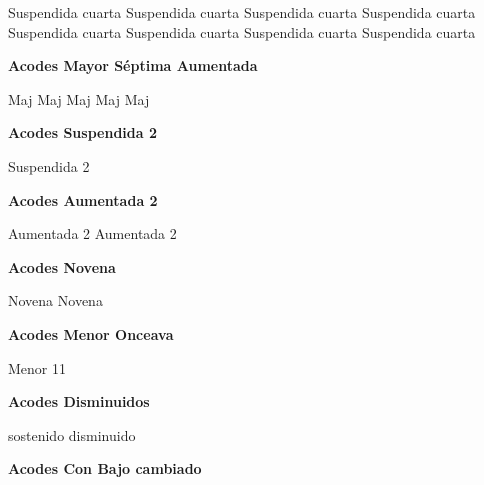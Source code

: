 \small
{} Suspendida cuarta  \qquad\qquad
{} Suspendida cuarta \qquad\qquad
{} Suspendida cuarta
\vskip 25pt
 Suspendida cuarta \qquad\qquad
{} Suspendida cuarta \qquad\qquad
{} Suspendida cuarta
\vskip 25pt
 Suspendida cuarta \qquad\qquad
{} Suspendida cuarta
\normalsize

\vskip 20pt
\textbf{Acodes Mayor S\'eptima Aumentada}
\vskip 25pt

\small
{} Maj \hfill
{} Maj \hfill
{} Maj \hfill\null\break
\vskip 20pt
 Maj \hfill
{} Maj \hfill\null\break
\normalsize

\vskip 20pt
\textbf{Acodes Suspendida 2}
\vskip 25pt

\small
{} Suspendida 2
\normalsize

\vskip 20pt
\textbf{Acodes Aumentada 2}
\vskip 25pt

\small
{} Aumentada 2
 Aumentada 2
\normalsize


\vskip 20pt
\textbf{Acodes Novena}
\vskip 25pt

\small
{} Novena
 Novena
\normalsize

\vskip 20pt
\textbf{Acodes Menor Onceava}
\vskip 25pt

\small
{} Menor 11
\normalsize


\vskip 20pt
\textbf{Acodes Disminuidos}
\vskip 25pt

\small
{} sostenido disminuido
\normalsize


\vskip 20pt
\textbf{Acodes Con Bajo cambiado}
\vskip 25pt

